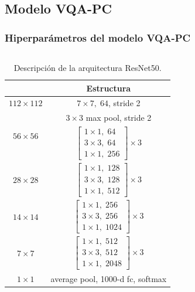 \subsection{Modelo VQA-PC}
\begin{frame}
  \frametitle{Hiperparámetros del modelo VQA-PC\footnotemark[12]}
    \begin{columns} 
\bgroup
\begin{table}[htp]
  \vspace{-.4cm}
  \scriptsize
  \begin{center}
    \begin{tabular}[b]{|c|c|}
      \hline
      \rowcolor[HTML]{FFC702}
      \multicolumn{1}{|c|}{\textbf{Salida}}  &
      \multicolumn{1}{c|}{\textbf{Estructura}} \\
      \hline
      $112\times112$ & $7\times7,\; 64$, stride 2 \\ 
      \hline 
      \multirow{2}{*}{$56\times56$} & $3\times3$ max pool, stride 2 \\ 
      \cline{2-2}
      & $\begin{bmatrix}1\times1,\; 64 \\ 3\times3,\; 64 \\ 1\times1,\; 256 \end{bmatrix}\times 3$ \\ 
      \hline
      $28\times28$ & $\begin{bmatrix}1\times1,\; 128 \\ 3\times3,\; 128 \\ 1\times1,\; 512 \end{bmatrix}  \times 3 $\\ 
      \hline
      $14\times14$ & $\begin{bmatrix}1\times1,\; 256 \\ 3\times3,\; 256 \\ 1\times1,\; 1024 \end{bmatrix} \times 3$ \\ 
      \hline
      $7\times7$   & $\begin{bmatrix}1\times1,\; 512 \\ 3\times3,\; 512 \\ 1\times1,\; 2048 \end{bmatrix}  \times 3 $\\ 
      \hline
      $1\times1$   & average pool, 1000-d fc, softmax\\ 
      \hline
      \end{tabular}
  \end{center}
  \caption{Descripción de la arquitectura ResNet50.}
  \label{tab:ResNet50}
\end{table}
\egroup


\end{columns}
\end{frame}
